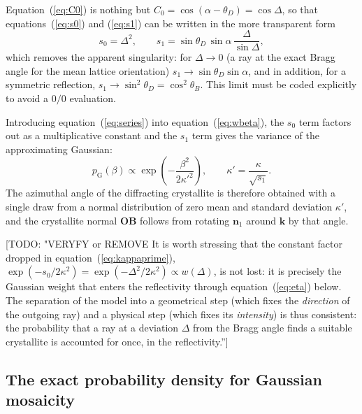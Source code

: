 \documentclass{iucr}
\newcommand{\todo}[1]{{\color{red}[TODO: "#1'']}}
\begin{document}
Equation~(\ref{eq:C0}) is nothing but $C_0 = \cos(\alpha-\theta_D) = \cos\Delta$,
so that equations~(\ref{eq:s0}) and (\ref{eq:s1}) can be written in the more
transparent form
\begin{equation}
s_0 = \Delta^2 ,
\qquad
s_1 = \sin\theta_D \, \sin\alpha \, \frac{\Delta}{\sin\Delta} ,
\label{eq:s0s1_simple}
\end{equation}
which removes the apparent singularity: for $\Delta \rightarrow 0$ (a ray at the
exact Bragg angle for the mean lattice orientation)
$s_1 \rightarrow \sin\theta_D \sin\alpha$, and in addition, for a symmetric
reflection, $s_1 \rightarrow \sin^2\theta_D = \cos^2\theta_B$. This limit must be
coded explicitly to avoid a $0/0$ evaluation.

Introducing equation~(\ref{eq:series}) into equation~(\ref{eq:wbeta}), the $s_0$
term factors out as a multiplicative constant and the $s_1$ term gives the variance
of the approximating Gaussian:
\begin{equation}
p_\mathrm{G}(\beta) \propto \exp\left( -\frac{\beta^2}{2\kappa'^2} \right) ,
\qquad
\kappa' = \frac{\kappa}{\sqrt{s_1}} .
\label{eq:kappaprime}
\end{equation}
The azimuthal angle of the diffracting crystallite is therefore obtained with a
single draw from a normal distribution of zero mean and standard deviation
$\kappa'$, and the crystallite normal $\mathbf{OB}$ follows from rotating
$\mathbf{n}_1$ around $\mathbf{k}$ by that angle.

\todo{VERYFY or REMOVE It is worth stressing that the constant factor dropped in
equation~(\ref{eq:kappaprime}), $\exp(-s_0/2\kappa^2) = \exp(-\Delta^2/2\kappa^2)
\propto w(\Delta)$, is not lost: it is precisely the Gaussian weight that enters
the reflectivity through equation~(\ref{eq:eta}) below. The separation of the
model into a geometrical step (which fixes the \emph{direction} of the outgoing
ray) and a physical step (which fixes its \emph{intensity}) is thus consistent: the
probability that a ray at a deviation $\Delta$ from the Bragg angle finds a
suitable crystallite is accounted for once, in the reflectivity.}

\subsection{The exact probability density for Gaussian mosaicity}
\label{sec:geometry:exact}
\end{document}
